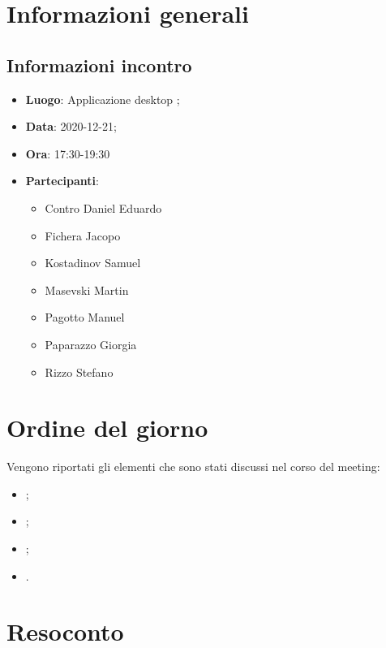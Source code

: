 \documentclass{article}
\begin{document}
	
	

\section{Informazioni generali}
\label{sec:info_generali}

\subsection{Informazioni incontro}
\label{sub:info_incontro}

\begin{itemize}
	\item \textbf{Luogo}: Applicazione desktop ;
	\item \textbf{Data}: 2020-12-21;
	\item \textbf{Ora}: 17:30-19:30
	\item \textbf{Partecipanti}:
	\begin{itemize}
		\item Contro Daniel Eduardo
		\item Fichera Jacopo
		\item Kostadinov Samuel
		\item Masevski Martin
		\item Pagotto Manuel
		\item Paparazzo Giorgia
		\item Rizzo Stefano
	\end{itemize}
\end{itemize}
	

\section{Ordine del giorno}
\label{sec:ordine_del_giorno}
	Vengono riportati gli elementi che sono stati discussi nel corso del meeting:
	\begin{itemize}
		\item {};
		\item {};
		\item {};
		\item {}.
	\end{itemize}

\section{Resoconto}
\label{sec:resoconto}
\end{document}
